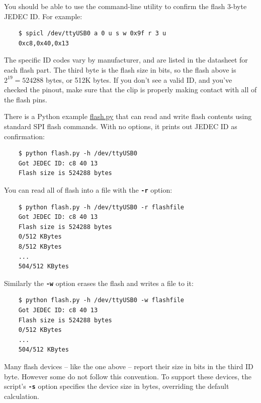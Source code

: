 \documentclass{article}
\newcommand{\mach}[1]{\texttt{\textbf{#1}}}
\begin{document}
You should be able to use the command-line utility to confirm the flash 3-byte JEDEC ID.
For example:

\begin{lstlisting}
    $ spicl /dev/ttyUSB0 a 0 u s w 0x9f r 3 u
    0xc8,0x40,0x13
\end{lstlisting}

The specific ID codes vary by manufacturer, and are listed in the datasheet for each flash part.
The third byte is the flash size in bits, so the flash above is
$2^{19} = 524288$ bytes, or 512K bytes.
If you don't see a valid ID, and you've checked the pinout,
make sure that the clip is properly making contact with all of the flash pins.

There is a Python example
\href{https://github.com/jamesbowman/spidriver/blob/master/python/samples/flash.py>}{flash.py}
that can read and write flash contents using standard
SPI flash commands.
With no options, it prints out JEDEC ID as confirmation:

\begin{lstlisting}
    $ python flash.py -h /dev/ttyUSB0
    Got JEDEC ID: c8 40 13
    Flash size is 524288 bytes
\end{lstlisting}

You can read all of flash into a file with the \mach{-r} option:

\begin{lstlisting}
    $ python flash.py -h /dev/ttyUSB0 -r flashfile
    Got JEDEC ID: c8 40 13
    Flash size is 524288 bytes
    0/512 KBytes
    8/512 KBytes
    ...
    504/512 KBytes
\end{lstlisting}

Similarly the \mach{-w} option erases the flash and writes a file to it:

\begin{lstlisting}
    $ python flash.py -h /dev/ttyUSB0 -w flashfile
    Got JEDEC ID: c8 40 13
    Flash size is 524288 bytes
    0/512 KBytes
    ...
    504/512 KBytes
\end{lstlisting}

Many flash devices -- like the one above -- report their size in bits in the third ID byte.
However some do not follow this convention.
To support these devices, the script's
\mach{-s} option specifies the device size in bytes, overriding the default calculation.

% 
% 
\end{document}
